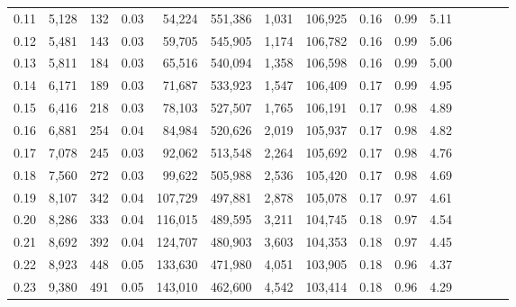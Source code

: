 \begin{tabular}{rrrcrrrrrrrrrrr}
0.11 &   5,128 &    132 &                                       0.03 &   54,224 &  551,386 &    1,031 &  106,925 &  0.16 &  0.99 &                         5.11 \\
0.12 &   5,481 &    143 &                                       0.03 &   59,705 &  545,905 &    1,174 &  106,782 &  0.16 &  0.99 &                         5.06 \\
0.13 &   5,811 &    184 &                                       0.03 &   65,516 &  540,094 &    1,358 &  106,598 &  0.16 &  0.99 &                         5.00 \\
0.14 &   6,171 &    189 &                                       0.03 &   71,687 &  533,923 &    1,547 &  106,409 &  0.17 &  0.99 &                         4.95 \\
0.15 &   6,416 &    218 &                                       0.03 &   78,103 &  527,507 &    1,765 &  106,191 &  0.17 &  0.98 &                         4.89 \\
0.16 &   6,881 &    254 &                                       0.04 &   84,984 &  520,626 &    2,019 &  105,937 &  0.17 &  0.98 &                         4.82 \\
0.17 &   7,078 &    245 &                                       0.03 &   92,062 &  513,548 &    2,264 &  105,692 &  0.17 &  0.98 &                         4.76 \\
0.18 &   7,560 &    272 &                                       0.03 &   99,622 &  505,988 &    2,536 &  105,420 &  0.17 &  0.98 &                         4.69 \\
0.19 &   8,107 &    342 &                                       0.04 &  107,729 &  497,881 &    2,878 &  105,078 &  0.17 &  0.97 &                         4.61 \\
0.20 &   8,286 &    333 &                                       0.04 &  116,015 &  489,595 &    3,211 &  104,745 &  0.18 &  0.97 &                         4.54 \\
0.21 &   8,692 &    392 &                                       0.04 &  124,707 &  480,903 &    3,603 &  104,353 &  0.18 &  0.97 &                         4.45 \\
0.22 &   8,923 &    448 &                                       0.05 &  133,630 &  471,980 &    4,051 &  103,905 &  0.18 &  0.96 &                         4.37 \\
0.23 &   9,380 &    491 &                                       0.05 &  143,010 &  462,600 &    4,542 &  103,414 &  0.18 &  0.96 &                         4.29 \\

\end{tabular}
